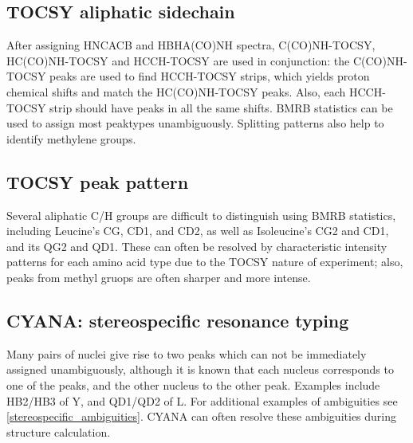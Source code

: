 \subsection*{TOCSY aliphatic sidechain}
After assigning HNCACB and HBHA(CO)NH spectra, C(CO)NH-TOCSY, HC(CO)NH-TOCSY 
and HCCH-TOCSY are used in conjunction:
the C(CO)NH-TOCSY peaks are used to find HCCH-TOCSY strips, which yields proton 
chemical shifts and match the HC(CO)NH-TOCSY peaks.  Also, each HCCH-TOCSY 
strip should have peaks in all the same \nmrisoh{} shifts.
BMRB statistics can be used to assign most peaktypes unambiguously.  
Splitting patterns also help to identify methylene groups.

\subsection*{TOCSY peak pattern}
Several aliphatic C/H groups are difficult to distinguish using BMRB statistics,
including Leucine's CG, CD1, and CD2, as well as Isoleucine's CG2 and CD1, and
its QG2 and QD1. These can often be resolved by characteristic intensity 
patterns for each amino acid type due to the TOCSY nature of experiment;
also, peaks from methyl gruops are often sharper and more intense.

\subsection*{CYANA: stereospecific resonance typing}
Many pairs of nuclei give rise to two peaks which can not be immediately
assigned unambiguously, although it is known that each nucleus corresponds 
to one of the peaks, and the other nucleus to the other peak.
Examples include HB2/HB3 of Y, and QD1/QD2 of L.
For additional examples of ambiguities see \ref{stereospecific_ambiguities}.
CYANA can often resolve these ambiguities during structure calculation.

